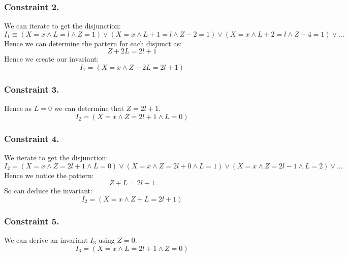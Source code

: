 \documentclass{report}
\begin{document}
\begin{itemize}
{	      \subsubsection*{Constraint 2.}
	      We can iterate to get the disjunction:
	      \[I_1 \equiv (X=x \land L=l \land Z = 1) \lor (X=x \land L+1 = l \land Z-2 = 1) \lor (X=x \land L+2 = l \land Z - 4 = 1) \lor \dots\]
	      Hence we can determine the pattern for each disjunct as:
	      \[Z + 2L = 2l + 1\]
	      Hence we create our invariant:
	      \[I_1 = (X = x \land Z + 2L = 2l + 1)\]
	      \subsubsection*{Constraint 3.}
	      Hence as $L=0$ we can determine that $Z = 2l + 1$.
	      \[I_2 = (X=x \land Z = 2l + 1 \land L = 0)\]
	      \subsubsection*{Constraint 4.}
	      We iterate to get the disjunction:
	      \[I_2 = (X = x  \land Z = 2l + 1 \land L = 0) \lor (X = x  \land Z = 2l + 0 \land L = 1) \lor (X = x  \land Z = 2l - 1 \land L = 2) \lor \dots\]
	      Hence we notice the pattern:
	      \[Z + L = 2l + 1\]
	      So can deduce the invariant:
	      \[I_2 = (X = x \land Z + L = 2l + 1)\]
	      \subsubsection*{Constraint 5.}
	      We can derive an invariant $I_3$ using $Z = 0$.
	      \[I_3 = (X=x \land L = 2l + 1 \land Z = 0)\]
}
\end{itemize}
\end{document}
